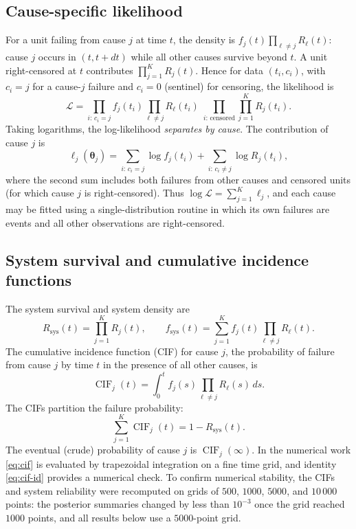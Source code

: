 \documentclass[ASNA,twocolumn]{USG}
\DeclareMathOperator{\CIF}{CIF}
\begin{document}
\subsection{Cause-specific likelihood}
For a unit failing from cause $j$ at time $t$, the density is
$f_j(t)\prod_{\ell\ne j}R_\ell(t)$: cause $j$ occurs in $(t,t+dt)$ while all
other causes survive beyond $t$. A unit right-censored at $t$ contributes
$\prod_{j=1}^K R_j(t)$. Hence for data $(t_i,c_i)$, with $c_i=j$ for a
cause-$j$ failure and $c_i=0$ (sentinel) for censoring, the likelihood is
\begin{equation}\label{eq:L}
\mathcal{L} =
\prod_{i:\,c_i=j} f_j(t_i)\!\!\prod_{\ell\ne j}\!\!R_\ell(t_i)
\;\prod_{i:\,\mathrm{censored}}\prod_{j=1}^K R_j(t_i).
\end{equation}
Taking logarithms, the log-likelihood \emph{separates by cause}. The
contribution of cause $j$ is
\begin{equation}\label{eq:Lj}
\ell_j(\bm\theta_j)
 = \sum_{i:\,c_i=j}\log f_j(t_i)
 + \sum_{i:\,c_i\ne j}\log R_j(t_i),
\end{equation}
where the second sum includes both failures from other causes and censored
units (for which cause $j$ is right-censored). Thus
$\log\mathcal{L}=\sum_{j=1}^K \ell_j$, and each cause may be fitted using a
single-distribution routine in which its own failures are events and all
other observations are right-censored.

\subsection{System survival and cumulative incidence functions}
The system survival and system density are
\begin{equation}\label{eq:Rsys}
R_{\mathrm{sys}}(t)=\prod_{j=1}^K R_j(t), \qquad
f_{\mathrm{sys}}(t)=\sum_{j=1}^K f_j(t)\prod_{\ell\ne j}R_\ell(t).
\end{equation}
The cumulative incidence function (CIF) for cause $j$, the probability of
failure from cause $j$ by time $t$ in the presence of all other causes, is
\begin{equation}\label{eq:cif}
\CIF_j(t)=\int_0^t f_j(s)\prod_{\ell\ne j}R_\ell(s)\,ds.
\end{equation}
The CIFs partition the failure probability:
\begin{equation}\label{eq:cif-id}
\sum_{j=1}^K \CIF_j(t)=1-R_{\mathrm{sys}}(t).
\end{equation}
The eventual (crude) probability of cause $j$ is $\CIF_j(\infty)$. In the
numerical work \eqref{eq:cif} is evaluated by trapezoidal integration on a
fine time grid, and identity \eqref{eq:cif-id} provides a numerical check.
To confirm numerical stability, the CIFs and system reliability were
recomputed on grids of $500$, $1000$, $5000$, and $10\,000$ points: the
posterior summaries changed by less than $10^{-3}$ once the grid reached
$1000$ points, and all results below use a $5000$-point grid.
\end{document}
